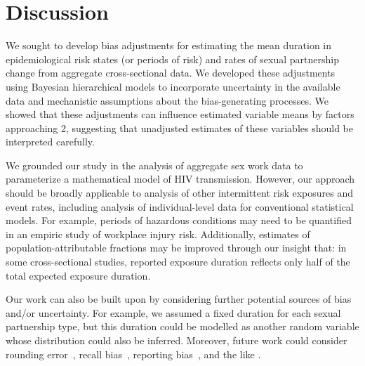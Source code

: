 \section{Discussion}
We sought to develop bias adjustments for estimating
the mean duration in epidemiological risk states (or periods of risk)
and rates of sexual partnership change
from aggregate cross-sectional data.
We developed these adjustments using Bayesian hierarchical models to incorporate
uncertainty in the available data and mechanistic assumptions about the bias-generating processes.
We showed that these adjustments can influence estimated variable means by factors approaching 2,
suggesting that unadjusted estimates of these variables should be interpreted carefully.
\par
We grounded our study in the analysis of aggregate sex work data
to parameterize a mathematical model of HIV transmission.
However, our approach should be broadly applicable to
analysis of other intermittent risk exposures and event rates,
including analysis of individual-level data for conventional statistical models.
For example, periods of hazardous conditions may need to be quantified
in an empiric study of workplace injury risk.
Additionally, estimates of population-attributable fractions
may be improved through our insight that: in some cross-sectional studies,
reported exposure duration reflects only half of the total expected exposure duration.
\par
Our work can also be built upon by considering
further potential sources of bias and/or uncertainty.
For example, we assumed a fixed duration for each sexual partnership type,
but this duration could be modelled as another random variable
whose distribution could also be inferred.
Moreover, future work could consider
rounding error~\cite{Mills2014},
recall bias~\cite{Ramjee1999},
reporting bias~\cite{Lowndes2012},
and the like \cite{Fenton2001}.
